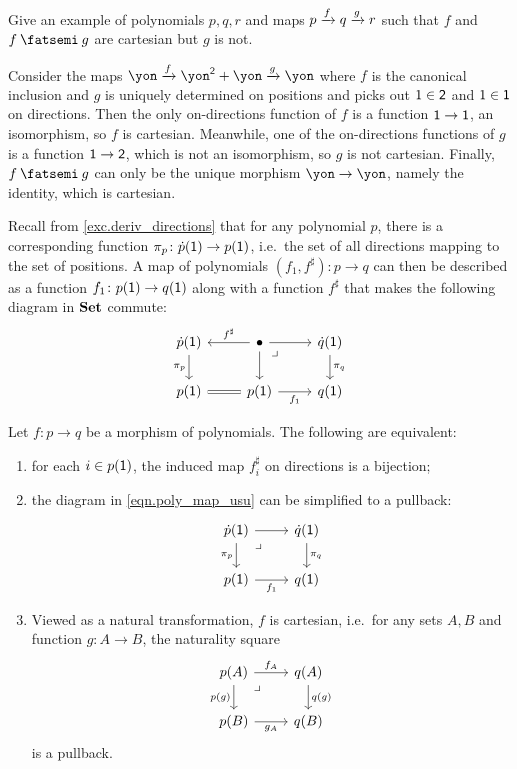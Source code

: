 \documentclass[Book-Poly]{subfiles}
\begin{document}
\begin{exercise}
Give an example of polynomials $p,q,r$ and maps $p\xrightarrow{f}q\xrightarrow{g}r$ such that $f$ and $f \then g$ are cartesian but $g$ is not.
\begin{solution}
Consider the maps $\yon \To{f} \yon^\2 + \yon \To{g} \yon$ where $f$ is the canonical inclusion and $g$ is uniquely determined on positions and picks out $1 \in \textsf{2}$ and $1 \in \textsf{1}$ on directions.
Then the only on-directions function of $f$ is a function $\textsf{1} \to \textsf{1}$, an isomorphism, so $f$ is cartesian.
Meanwhile, one of the on-directions functions of $g$ is a function $\textsf{1} \to \textsf{2}$, which is not an isomorphism, so $g$ is not cartesian.
Finally, $f \then g$ can only be the unique morphism $\yon \to \yon$, namely the identity, which is cartesian.
\end{solution}
\end{exercise}



Recall from \cref{exc.deriv_directions} that for any polynomial $p$, there is a corresponding function $\pi_p\colon\dot{p}(\textsf{1})\to p(\textsf{1})$, i.e.\ the set of all directions mapping to the set of positions.
A map of polynomials $(f_1,f^\sharp)\colon p\to q$ can then be described as a function $f_1\colon p(\textsf{1})\to q(\textsf{1})$ along with a function $f^\sharp$ that makes the following diagram in $\mathbf{Set}$ commute:
\begin{equation}\label{eqn.poly_map_usu}
\begin{tikzcd}
	\dot{p}(\1)\ar[d, "\pi_p"']&
	\bullet\ar[l, "f^\sharp"']\ar[r]\ar[d]&
	\dot{q}(\1)\ar[d, "\pi_q"]\\
	p(\1)\ar[r, equal]&
	p(\1)\ar[r, "f_1"']&
	q(\1)\ar[ul, phantom, very near end, "\lrcorner"]
\end{tikzcd}
\end{equation}

\begin{proposition}\label{prop.cart_as_nt}
Let $f\colon p\to q$ be a morphism of polynomials. The following are equivalent:
	\begin{enumerate}
		\item for each $i\in p(\textsf{1})$, the induced map $f^\sharp_i$ on directions is a bijection;
		\item the diagram in \eqref{eqn.poly_map_usu} can be simplified to a pullback:
\[
\begin{tikzcd}
	\dot{p}(\1)\ar[d, "\pi_p"']\ar[r]&
	\dot{q}(\1)\ar[d, "\pi_q"]\\
	p(\1)\ar[r, "f_1"']&
	q(\1)\ar[ul, phantom, very near end, "\lrcorner"]
\end{tikzcd}
\]		
		\item Viewed as a natural transformation, $f$ is cartesian, i.e.\ for any sets $A,B$ and function $g\colon A\to B$, the naturality square
\[
\begin{tikzcd}
	p(A)\ar[r, "f_A"]\ar[d, "p(g)"']&
	q(A)\ar[d, "q(g)"]\\
	p(B)\ar[r, "g_A"']&
	q(B)\ar[ul, phantom, very near end, "\lrcorner"]
\end{tikzcd}
\]
is a pullback.
  \end{enumerate}
\end{proposition}
\end{document}
